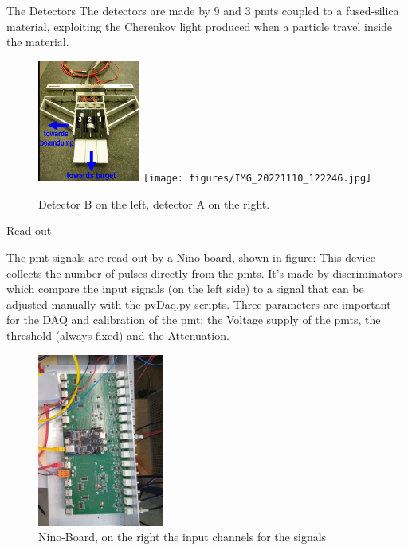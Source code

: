 \documentclass[8pt,a4paper]{beamer}
\begin{document}
\begin{frame}{The Detectors}
The detectors are made by 9 and 3 pmts coupled to a fused-silica material, exploiting the Cherenkov light produced when a particle travel inside the material.

\begin{figure}[hbtp]
\centering
\includegraphics[width = 0.3\textwidth]{figures/504px-Blackfalcon.jpg}
\hspace{2cm}
\texttt{[image: figures/IMG\_20221110\_122246.jpg]}
\caption{Detector B on the left, detector A on the right.}
\end{figure}

\end{frame}

\begin{frame}{Read-out}

The pmt signals are read-out by a Nino-board, shown in figure: This device collects the number of pulses directly from the pmts. It’s made by discriminators which compare the input signals (on the left side) to a signal that can be adjusted manually with the pvDaq.py scripts. Three parameters are important for the DAQ and calibration of the pmt: the Voltage supply of the pmts, the threshold (always fixed) and the Attenuation.

\begin{figure}[hbtp]
 
 \centering
 \includegraphics[width = 0.37\textwidth]{figures/NinoBoard.jpg}
 \caption{Nino-Board, on the right the input channels for the signals}
 \end{figure}
  
\end{frame}
\end{document}
